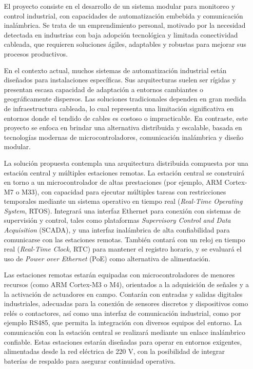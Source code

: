 \documentclass[
11pt, %
]{charter}
\begin{document}
El proyecto consiste en el desarrollo de un sistema modular para monitoreo y control industrial, con capacidades de automatización embebida y comunicación inalámbrica. Se trata de un emprendimiento personal, motivado por la necesidad detectada en industrias con baja adopción tecnológica y limitada conectividad cableada, que requieren soluciones ágiles, adaptables y robustas para mejorar sus procesos productivos.

En el contexto actual, muchos sistemas de automatización industrial están diseñados para instalaciones específicas. Sus arquitecturas suelen ser rígidas y presentan escasa capacidad de adaptación a entornos cambiantes o geográficamente dispersos. Las soluciones tradicionales dependen en gran medida de infraestructura cableada, lo cual representa una limitación significativa en entornos donde el tendido de cables es costoso o impracticable. En contraste, este proyecto se enfoca en brindar una alternativa distribuida y escalable, basada en tecnologías modernas de microcontroladores, comunicación inalámbrica y diseño modular.

La solución propuesta contempla una arquitectura distribuida compuesta por una estación central y múltiples estaciones remotas. La estación central se construirá en torno a un microcontrolador de altas prestaciones (por ejemplo, ARM Cortex-M7 o M33), con capacidad para ejecutar múltiples tareas con restricciones temporales mediante un sistema operativo en tiempo real (\textit{Real-Time Operating System}, RTOS). Integrará una interfaz Ethernet para conexión con sistemas de supervisión y control, tales como plataformas \textit{Supervisory Control and Data Acquisition} (SCADA), y una interfaz inalámbrica de alta confiabilidad para comunicarse con las estaciones remotas. También contará con un reloj en tiempo real (\textit{Real-Time Clock}, RTC) para mantener el registro horario, y se evaluará el uso de \textit{Power over Ethernet} (PoE) como alternativa de alimentación.

Las estaciones remotas estarán equipadas con microcontroladores de menores recursos (como ARM Cortex-M3 o M4), orientados a la adquisición de señales y a la activación de actuadores en campo. Contarán con entradas y salidas digitales industriales, adecuadas para la conexión de sensores discretos y dispositivos como relés o contactores, así como una interfaz de comunicación industrial, como por ejemplo RS485, que permita la integración con diversos equipos del entorno. La comunicación con la estación central se realizará mediante un enlace inalámbrico confiable. Estas estaciones estarán diseñadas para operar en entornos exigentes, alimentadas desde la red eléctrica de 220 V, con la posibilidad de integrar baterías de respaldo para asegurar continuidad operativa.
\end{document}
